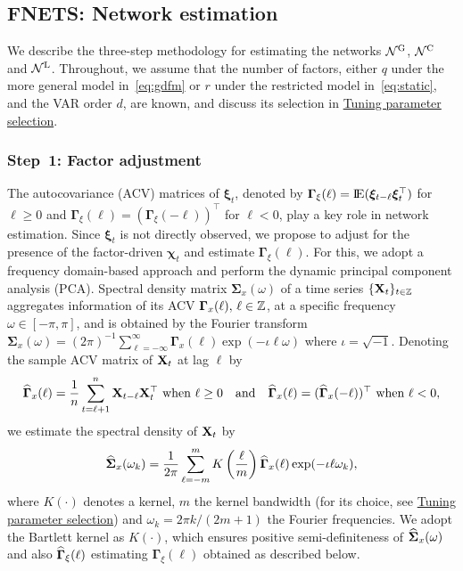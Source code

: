 \subsection{FNETS: Network estimation}    
\label{sec:estimation}

We describe the three-step methodology for estimating the networks $\mathcal N^{\text{\upshape{G}}}$, $\mathcal N^{\text{\upshape{C}}}$ and $\mathcal N^{\text{\upshape{L}}}$.
Throughout, we assume that the number of factors, either $q$ under the more general model in~\eqref{eq:gdfm} or $r$ under the restricted model in~\eqref{eq:static}, and the VAR order $d$, are known, and discuss its selection in \hyperref[sec:tuning]{Tuning parameter selection}. 

\subsubsection{Step~1: Factor adjustment}
\label{sec:step:one}

The autocovariance (ACV) matrices of $\bm\xi_t$, denoted by $\bm\Gamma_\xi(\ell) = \E(\bm\xi_{t - \ell} \bm\xi_t^\top)$ for $\ell \ge 0$ and $\bm\Gamma_\xi(\ell) = (\bm\Gamma_\xi(- \ell))^\top$ for $\ell < 0$, play a key role in network estimation.
Since $\bm\xi_t$ is not directly observed, we propose to adjust for the presence of the factor-driven $\bm\chi_t$ and estimate $\bm\Gamma_\xi(\ell)$.
For this, we adopt a frequency domain-based approach and perform the dynamic principal component analysis (PCA).
Spectral density matrix $\bm\Sigma_x(\omega)$ of a time series $\{\mathbf X_t\}_{t \in \mathbb{Z}}$ aggregates information of its ACV $\bm\Gamma_x(\ell), \, \ell \in \mathbb{Z}$, at a specific frequency $\omega \in [-\pi, \pi]$, and is obtained by the Fourier transform $\bm\Sigma_x(\omega) = (2\pi)^{-1} \sum_{\ell = -\infty}^\infty \bm\Gamma_x(\ell) \exp(-\iota \ell \omega)$ where $\iota = \sqrt{ - 1}$.
Denoting the sample ACV matrix of $\mathbf X_t$ at lag $\ell$ by
\begin{align*}
\widehat{\bm\Gamma}_x(\ell) = \frac{1}{n} \sum_{t = \ell + 1}^n \mathbf X_{t - \ell} \mathbf X_t^\top
\text{ when } \ell \ge 0 \quad \text{and} \quad
\widehat{\bm\Gamma}_x(\ell) = (\widehat{\bm\Gamma}_x(-\ell))^\top
\text{ when } \ell < 0,
\end{align*}
we estimate the spectral density of $\mathbf X_t$ by
\begin{align}
\label{eq:sigma:hat}
\widehat{\bm\Sigma}_x(\omega_k) = \frac{1}{2\pi} \sum_{\ell = -m}^m K\left(\frac{\ell}{m}\right)
\widehat{\bm\Gamma}_x(\ell) \exp(-\iota \ell \omega_k), 
\end{align} 
where $K(\cdot)$ denotes a kernel, $m$ the kernel bandwidth (for its choice, see \hyperref[sec:tuning]{Tuning parameter selection}) and $\omega_k = 2\pi k / (2m + 1)$ the Fourier frequencies. 
We adopt the Bartlett kernel as $K(\cdot)$, which ensures positive semi-definiteness of $\widehat{\bm\Sigma}_x(\omega)$ and also $\widehat{\bm\Gamma}_\xi(\ell)$ estimating $\bm\Gamma_\xi(\ell)$ obtained as described below.

